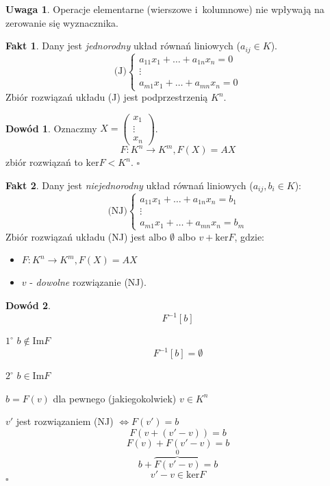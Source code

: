 \documentclass[12pt,a4paper]{article}
\renewcommand{\qed}{$\square$}
\theoremstyle{plain}
\theoremstyle{definition}
\newtheorem{ft}{Fakt}[section]
\theoremstyle{definition}
\theoremstyle{definition}
\theoremstyle{definition}
\newtheorem*{dd}{Dowód}
\theoremstyle{definition}
\theoremstyle{definition}
\theoremstyle{definition}
\theoremstyle{definition}
\newtheorem*{uw}{Uwaga}
\theoremstyle{definition}
\begin{document}
\begin{uw}
  Operacje elementarne (wierszowe i~kolumnowe) nie wpływają na zerowanie się
  wyznacznika.
\end{uw}
\begin{ft}
  Dany jest \textit{jednorodny} układ równań liniowych ($a_{ij} \in K$).
  \[\text{(J)}\left\{\begin{array}{l}
      a_{11}x_1+\dots+a_{1n}x_n = 0
      \\\vdots\\
      a_{m1}x_1+\dots+a_{mn}x_n = 0
    \end{array}\right.\]
  Zbiór rozwiązań układu (J) jest podprzestrzenią $K^n$.
\end{ft}
\begin{dd}
  Oznaczmy $X = \begin{pmatrix}x_1\\\vdots\\x_n\end{pmatrix}$.
  \[F: K^n \rightarrow K^m, F(X)=AX\]
  zbiór rozwiązań to $\mathrm{ker}F < K^n$.
  \hfill \qed
\end{dd}
\begin{ft}
  Dany jest \textit{niejednorodny} układ równań liniowych
  ($a_{ij}, b_i \in K$):
  \[\text{(NJ)}\left\{\begin{array}{l}
      a_{11}x_1+\dots+a_{1n}x_n = b_1
      \\\vdots\\
      a_{m1}x_1+\dots+a_{mn}x_n = b_m
    \end{array}\right.\]
  Zbiór rozwiązań układu (NJ) jest albo $\emptyset$ albo ${v}+\mathrm{ker}F$,
  gdzie:
  \begin{itemize}
    \item $F: K^n \rightarrow K^m, F(X)=AX$
    \item $v$ - \textit{dowolne} rozwiązanie (NJ).
  \end{itemize}
\end{ft}
\begin{dd}
  \[F^{-1}[b]\]

  $1^\circ$ $b \notin \mathrm{Im} F$
  \[F^{-1}[b] = \emptyset\]

  $2^\circ$ $b \in \mathrm{Im} F$ \\
  \begin{center}$b= F(v)$ dla pewnego (jakiegokolwiek) $v\in K^n$\end{center}

  $v'$ jest rozwiązaniem (NJ) $\Leftrightarrow F(v')=b$
  \[F(v+(v'-v)) = b\]
  \[F(v)+F(v'-v) = b\]
  \[b+\overbrace{F(v'-v)}^0 = b\]
  \[v'-v \in \mathrm{ker}F\]
  \hfill \qed
\end{dd}
\end{document}
